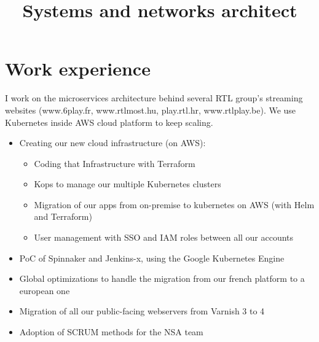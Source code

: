 \documentclass[12pt,a4paper,roman]{moderncv}          %
\title{Systems and networks architect}
\begin{document}
\makecvtitle


\section{Work experience}
{I work on the microservices architecture behind several RTL group's streaming websites (www.6play.fr, www.rtlmost.hu, play.rtl.hr, www.rtlplay.be). We use Kubernetes inside AWS cloud platform to keep scaling.
\begin{itemize}
  \item Creating our new cloud infrastructure (on AWS):
  \begin{itemize}
    \item Coding that Infrastructure with Terraform
    \item Kops to manage our multiple Kubernetes clusters
    \item Migration of our apps from on-premise to kubernetes on AWS (with Helm and Terraform)
    \item User management with SSO and IAM roles between all our accounts
  \end{itemize}
  \item PoC of Spinnaker and Jenkins-x, using the Google Kubernetes Engine
  \item Global optimizations to handle the migration from our french platform to a european one
  \item Migration of all our public-facing webservers from Varnish 3 to 4
  \item Adoption of SCRUM methods for the NSA team
\end{itemize}}
\end{document}
